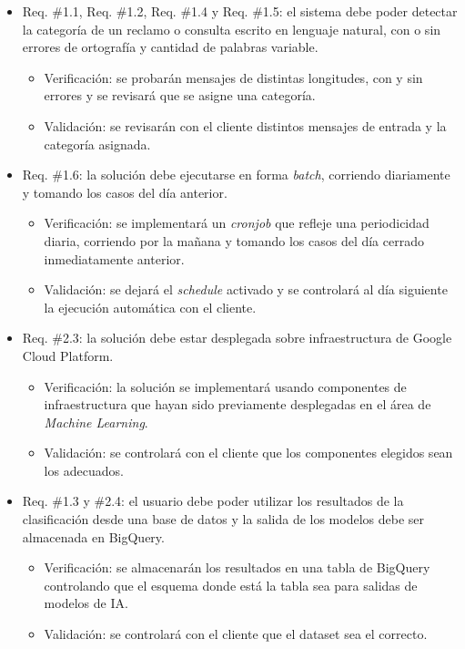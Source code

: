 \documentclass[
11pt, %
]{charter}
\begin{document}
\begin{itemize} 
	\item Req. \#1.1, Req. \#1.2, Req. \#1.4 y Req. \#1.5: el sistema debe poder detectar la categoría de un reclamo o consulta escrito en lenguaje natural, con o sin errores de ortografía y cantidad de palabras variable.
	\begin{itemize}
		\item Verificación: se probarán mensajes de distintas longitudes, con y sin errores y se revisará que se asigne una categoría.
		\item Validación: se revisarán con el cliente distintos mensajes de entrada y la categoría asignada.
	\end{itemize}
	\item Req. \#1.6: la solución debe ejecutarse en forma \textit{batch}, corriendo diariamente y tomando los casos del día anterior.
	\begin{itemize}
		\item Verificación: se implementará un \textit{cronjob} que refleje una periodicidad diaria, corriendo por la mañana y tomando los casos del día cerrado inmediatamente anterior. 
		\item Validación: se dejará el \textit{schedule} activado y se controlará al día siguiente la ejecución automática con el cliente.
	\end{itemize}
	\item Req. \#2.3: la solución debe estar desplegada sobre infraestructura de Google Cloud Platform.
	\begin{itemize}
		\item Verificación: la solución se implementará usando componentes de infraestructura que hayan sido previamente desplegadas en el área de \textit{Machine Learning}.
		\item Validación: se controlará con el cliente que los componentes elegidos sean los adecuados.
	\end{itemize}
	\item Req. \#1.3 y \#2.4: el usuario debe poder utilizar los resultados de la clasificación desde una base de datos y la salida de los modelos debe ser almacenada en BigQuery.
	\begin{itemize}
		\item Verificación: se almacenarán los resultados en una tabla de BigQuery controlando que el esquema donde está la tabla sea para salidas de modelos de IA.
		\item Validación: se controlará con el cliente que el dataset sea el correcto.

\end{itemize}
\end{itemize}
\end{document}
